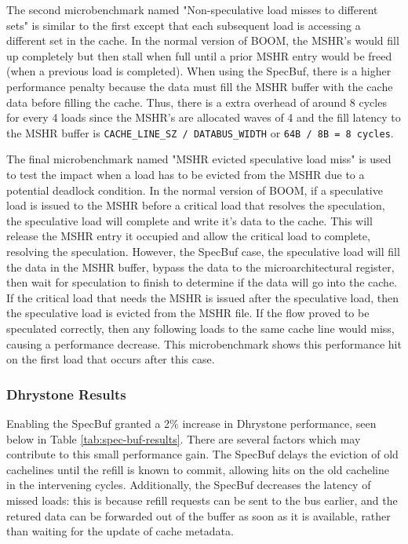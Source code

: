 The second microbenchmark named "Non-speculative load misses to different sets" is similar to the first except that each subsequent
load is accessing a different set in the cache. In the normal version of BOOM, the MSHR's would fill up completely but then stall 
when full until a prior MSHR entry would be freed (when a previous load is completed). When using the SpecBuf, there is a
higher performance penalty because the data must fill the MSHR buffer with the cache data before filling the cache. Thus, there 
is a extra overhead of around 8 cycles for every 4 loads since the MSHR's are allocated waves of 4 and the fill latency to the MSHR
buffer is {\tt CACHE\_LINE\_SZ / DATABUS\_WIDTH} or {\tt 64B / 8B = 8 cycles}.

The final microbenchmark named "MSHR evicted speculative load miss" is used to test the impact when a load has to be evicted from the 
MSHR due to a potential deadlock condition. In the normal version of BOOM, if a speculative load is issued to the 
MSHR before a critical load that resolves the speculation, the speculative load will complete and
write it's data to the cache. This will release the MSHR entry it occupied and allow the critical load to complete, resolving the speculation. 
However, the SpecBuf case, the speculative load will fill the data in the MSHR buffer, bypass the data to the microarchitectural register, 
then wait for speculation to finish to determine if the data will go into the cache. If the critical load that needs the MSHR is issued after the speculative load,
then the speculative load is evicted from the MSHR file. If the 
flow proved to be speculated correctly, then any following loads to the same cache line would miss, causing a performance decrease.
This microbenchmark shows this performance hit on the first load that occurs after this case.

\subsubsection{Dhrystone Results}
Enabling the SpecBuf granted a 2\% increase in Dhrystone performance, seen below in Table \ref{tab:spec-buf-results}. There are several factors which may contribute to this small performance gain. The SpecBuf delays the eviction of old cachelines until the refill is known to commit, allowing hits on the old cacheline in the intervening cycles. Additionally, the SpecBuf decreases the latency of missed loads: this is because refill requests can be sent to the bus earlier, and the retured data can be forwarded out of the buffer as soon as it is available, rather than waiting for the update of cache metadata.

